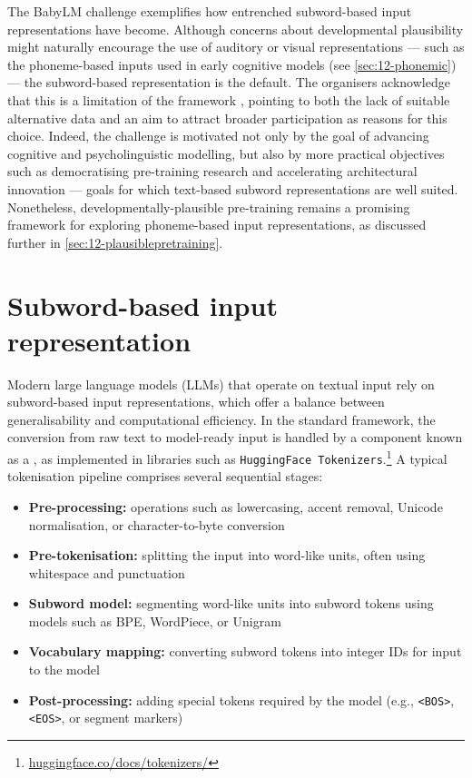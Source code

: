 The BabyLM challenge exemplifies how entrenched subword-based input representations have become. Although concerns about developmental plausibility might naturally encourage the use of auditory or visual representations --- such as the phoneme-based inputs used in early cognitive models (see \cref{sec:12-phonemic}) --- the subword-based representation is the default. The organisers acknowledge that this is a limitation of the framework \citep{wilcox2025}, pointing to both the lack of suitable alternative data and an aim to attract broader participation as reasons for this choice. Indeed, the challenge is motivated not only by the goal of advancing cognitive and psycholinguistic modelling, but also by more practical objectives such as democratising pre-training research and accelerating architectural innovation --- goals for which text-based subword representations are well suited. Nonetheless, developmentally-plausible pre-training remains a promising framework for exploring phoneme-based input representations, as discussed further in \cref{sec:12-plausiblepretraining}.

\section{Subword-based input representation}\label{sec:12-subword}

Modern large language models (LLMs) that operate on textual input rely on subword-based input representations, which offer a balance between generalisability and computational efficiency. In the standard framework, the conversion from raw text to model-ready input is handled by a component known as a , as implemented in libraries such as \texttt{HuggingFace Tokenizers}.\footnote{\href{https://huggingface.co/docs/tokenizers/index}{huggingface.co/docs/tokenizers/}} A typical tokenisation pipeline comprises several sequential stages:

\begin{itemize}
\item \textbf{Pre-processing:} operations such as lowercasing, accent removal, Unicode normalisation, or character-to-byte conversion
\item \textbf{Pre-tokenisation:} splitting the input into word-like units, often using whitespace and punctuation
\item \textbf{Subword model:} segmenting word-like units into subword tokens using models such as BPE, WordPiece, or Unigram
\item \textbf{Vocabulary mapping:} converting subword tokens into integer IDs for input to the model
\item \textbf{Post-processing:} adding special tokens required by the model (e.g., \texttt{<BOS>}, \texttt{<EOS>}, or segment markers)
\end{itemize}

